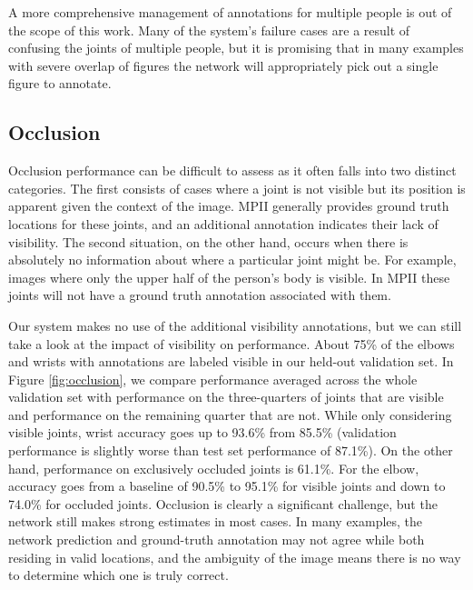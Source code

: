 \documentclass[runningheads]{llncs}
\begin{document}
A more comprehensive management of annotations for multiple people is
out of the scope of this work. Many of the system's failure cases are
a result of confusing the joints of multiple people, but it is
promising that in many examples with severe overlap of figures the
network will appropriately pick out a single figure to annotate. 

\subsection{Occlusion}

Occlusion performance can be difficult to assess as it often falls
into two distinct categories. The first consists of cases where a
joint is not visible but its position is apparent given the context of
the image. MPII generally provides ground truth locations for these
joints, and an additional annotation indicates their lack of
visibility. The second situation, on the other hand, occurs when there
is absolutely no information about where a particular joint might
be. For example, images where only the upper half of the person's body
is visible. In MPII these joints will not have a ground truth
annotation associated with them.

Our system makes no use of the additional visibility annotations, but
we can still take a look at the impact of visibility on
performance. About 75\% of the elbows and wrists with annotations are
labeled visible in our held-out validation set. In Figure
\ref{fig:occlusion}, we compare performance averaged across the whole
validation set with performance on the three-quarters of joints that
are visible and performance on the remaining quarter that are
not. While only considering visible joints, wrist accuracy goes up to
93.6\% from 85.5\% (validation performance is slightly worse than test
set performance of 87.1\%). On the other hand, performance on
exclusively occluded joints is 61.1\%. For the elbow, accuracy goes
from a baseline of 90.5\% to 95.1\% for visible joints and down to
74.0\% for occluded joints. Occlusion is clearly a significant
challenge, but the network still makes strong estimates in most
cases. In many examples, the network prediction and ground-truth
annotation may not agree while both residing in valid locations, and
the ambiguity of the image means there is no way to determine which
one is truly correct.
\end{document}
